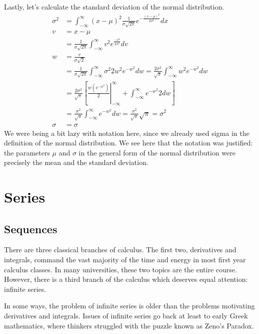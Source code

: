 \documentclass[fleqn]{report}
\begin{document}
\begin{example}
Lastly, let's calculate the standard deviation of the normal
distribution.
\begin{align*}
\sigma^2 & = \int_{-\infty}^\infty (x-\mu)^2 \frac{1}{\sigma
\sqrt{2\pi}} e^{-\frac{(x-\mu)^2}{2\sigma^2}} dx \\
v & = x - \mu \\
& = \frac{1}{\sigma \sqrt{2\pi}} \int_{-\infty}^\infty v^2
e^{\frac{-v^2}{2\sigma^2}} dv \\
w & = \frac{v}{\sigma \sqrt{2}} \\
& = \frac{1}{\sigma \sqrt{2\pi}} \int_{-\infty}^\infty \sigma^2
2 w^2 e^{-w^2} dw = \frac{2\sigma^2}{\sqrt{\pi}}
\int_{-\infty}^\infty w^2 e^{-w^2} dw \\
& = \frac{2\sigma^2}{\sqrt{\pi}} \left[ \left.
\frac{w(e^{-w^2})}{2} \right|_{-\infty}^\infty +
\int_{-\infty}^\infty e^{-w^2}{2} dw \right] \\
& = \frac{\sigma^2}{\sqrt{\pi}} \int_{-\infty}^\infty e^{-w^2}dw
= \frac{\sigma^2}{\sqrt{\pi}} \sqrt{\pi} = \sigma^2\\
\sigma & = \sigma
\end{align*}
We were being a bit lazy with notation here, since we already
used sigma in the definition of the normal distribution. We
see here that the notation was justified: the parameters $\mu$
and $\sigma$ in the general form of the normal distribution
were precisely the mean and the standard deviation.
\end{example}

\chapter{Series}
\label{Series}

\section{Sequences}
\label{sequences}

There are three classical branches of calculus.
The first two, derivatives and integrals, command the vast
majority of the time and energy in most first year calculus
classes. In many universities, these two topics are the
entire course. However, there is a third branch of the
calculus which deserves equal attention: infinite
series.

In some ways, the problem of infinite series is older than
the problems motivating derivatives and integrals.
Issues of infinite series go back at least to early Greek mathematics,
where thinkers struggled with the puzzle known as Zeno's
Paradox.
\end{document}
